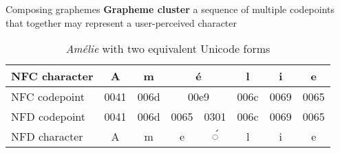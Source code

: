 \documentclass[../index.tex]{subfiles}
\begin{document}
\renewcommand{\currenttitle}{Composing graphemes}
\begin{frame}{\currenttitle}
%
%
%
%
%
%
  \textbf{Grapheme cluster} \textendash{} a sequence of multiple codepoints that together may
    represent a user-perceived character

  \begin{table}
    \footnotesize
    \begin{tabular}{|l||c|c|c|c|c|c|c|} \hline
      NFC character & A     & m     & \multicolumn{2}{c|}{é}     & l     & i     & e \\ \hline
      NFC codepoint & 0041  & 006d  & \multicolumn{2}{c|}{00e9}  & 006c  & 0069  & 0065 \\ \hline
      NFD codepoint & 0041  & 006d  & 0065        & 0301        & 006c  & 0069  & 0065 \\ \hline
      NFD character & A     & m     & e           & ◌́           & l     & i     & e \\ \hline
    \end{tabular}
    \caption{\textit{Amélie} with two equivalent Unicode forms}
  \end{table}
\end{frame}
\end{document}
